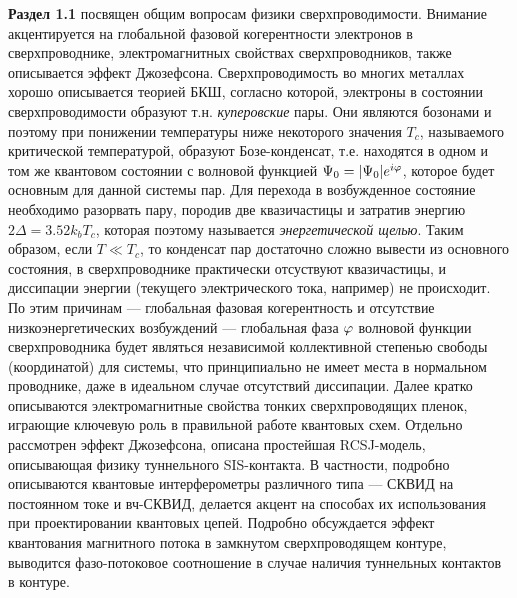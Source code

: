 \textbf{Раздел 1.1} посвящен общим вопросам физики сверхпроводимости. Внимание акцентируется на глобальной фазовой когерентности электронов в сверхпроводнике, электромагнитных свойствах сверхпроводников, также описывается эффект Джозефсона. Сверхпроводимость во многих металлах хорошо описывается теорией БКШ, согласно которой, электроны в состоянии сверхпроводимости образуют т.н. \textit{куперовские} пары. Они являются бозонами и поэтому при понижении температуры ниже некоторого значения $T_c$, называемого критической температурой, образуют Бозе-конденсат, т.е. находятся в одном и том же квантовом состоянии с волновой функцией $\Psi_0=|\Psi_0|e^{i\varphi}$, которое будет основным для данной системы пар. Для перехода в возбужденное состояние необходимо разорвать пару, породив две квазичастицы и затратив энергию $2\Delta=3.52k_bT_c$, которая поэтому называется \textit{энергетической щелью}. Таким образом, если $T\ll T_c$, то конденсат пар достаточно сложно вывести из основного состояния, в сверхпроводнике практически отсуствуют квазичастицы, и диссипации энергии (текущего электрического тока, например) не происходит. По этим причинам --- глобальная фазовая когерентность и отсутствие низкоэнергетических возбуждений --- глобальная фаза $\varphi$ волновой функции сверхпроводника будет являться независимой коллективной степенью свободы (координатой) для системы, что принципиально не имеет места в нормальном проводнике, даже в идеальном случае отсутствий диссипации.  Далее кратко описываются электромагнитные свойства тонких сверхпроводящих пленок, играющие ключевую роль в правильной работе квантовых схем. Отдельно рассмотрен эффект Джозефсона, описана простейшая RCSJ-модель, описывающая физику туннельного SIS-контакта. В частности, подробно описываются квантовые интерферометры различного типа --- СКВИД на постоянном токе и вч-СКВИД, делается акцент на способах их использования при проектировании квантовых цепей. Подробно обсуждается эффект квантования магнитного потока в замкнутом сверхпроводящем контуре, выводится фазо-потоковое соотношение в случае наличия туннельных контактов в контуре.

